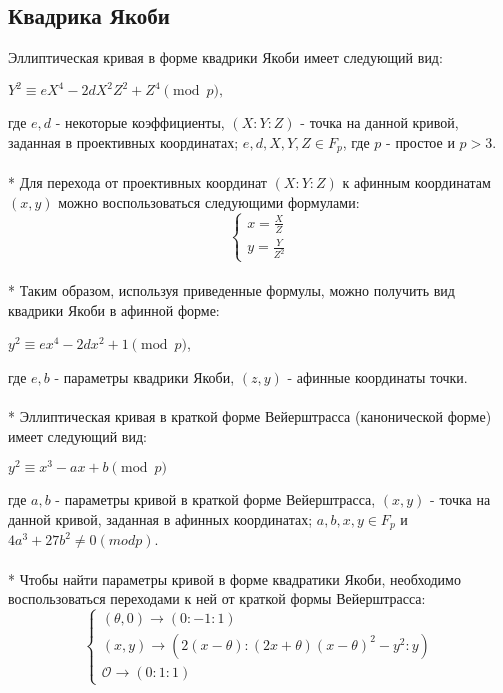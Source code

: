 \documentclass[12pt]{article}
\begin{document}
\subsection{Квадрика Якоби}
Эллиптическая кривая в форме квадрики Якоби имеет следующий вид:
\begin{center}
$Y^2 \equiv eX^4 - 2dX^2Z^2 + Z^4 \pmod{p},$
\end{center}
где $e, d$ - некоторые коэффициенты, $(X : Y : Z)$ - точка на данной кривой, заданная в проективных координатах; $e, d, X, Y, Z \in F_p$, где $p$ - простое и $p > 3$. \\
\\*
Для перехода от проективных координат $(X : Y : Z)$ к афинным координатам $(x, y)$ можно воспользоваться следующими формулами: \\
\begin{equation*}
\begin{cases}
x = \frac{X}{Z}
\\
y = \frac{Y}{Z^2}
\end{cases}
\end{equation*}
\\*
Таким образом, используя приведенные формулы, можно получить вид квадрики Якоби в афинной форме:
\begin{center}
$y^2 \equiv ex^4 - 2dx^2+1 \pmod{p}$,
\end{center}
где $e, b$ - параметры квадрики Якоби, $(z, y)$ - афинные координаты точки.\\
\\*
Эллиптическая кривая в краткой форме Вейерштрасса (канонической форме) имеет следующий вид:
\begin{center}
$y^2 \equiv x^3 - ax + b \pmod{p}$
\end{center}
где $a, b$ - параметры кривой в краткой форме Вейерштрасса, $(x, y)$ - точка на данной кривой, заданная в афинных координатах; $a, b, x, y \in F_p$ и $4a^3 + 27b^2 \neq 0 (mod p)$.\\
\\*
Чтобы найти параметры кривой в форме квадратики Якоби, необходимо воспользоваться переходами к ней от краткой формы Вейерштрасса:
\begin{equation*}
\begin{cases}
(\theta, 0) \rightarrow (0 : -1 : 1)
\\
(x, y) \rightarrow (2(x - \theta) : (2x + \theta)(x - \theta)^2 - y^2 : y)
\\
\mathcal{O} \rightarrow (0 : 1 : 1)
\end{cases}
\end{equation*}
\end{document}
